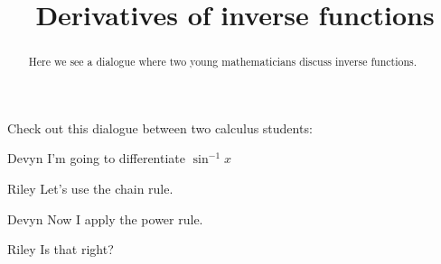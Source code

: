 \documentclass{ximera}
\title[Break-Ground:]{Derivatives of inverse functions}
\begin{document}
\begin{abstract}
Here we see a dialogue where two young mathematicians discuss inverse functions.
\end{abstract}
\maketitle

Check out this dialogue between two calculus students:

\begin{dialogue}
\item[Devyn] I'm going to differentiate $\sin^{-1} x$
\item[Riley] Let's use the chain rule.
\item[Devyn] Now I apply the power rule.
\item[Riley] Is that right?
\end{dialogue}





\end{document}
